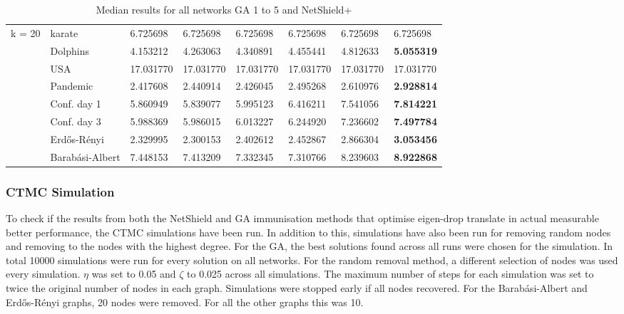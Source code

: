 \documentclass[11pt]{article}
\theoremstyle{definition}
\begin{document}
\begin{table}
\begin{center}
{\begin{tabular}{ | l | l | l | l | l | l | l | l | }
                & & & & & & & \\ \hline
                k = 20 & karate & 6.725698& 6.725698& 6.725698& 6.725698& 6.725698& 6.725698 \\ \hline
                & Dolphins & 4.153212& 4.263063& 4.340891& 4.455441& 4.812633& \textbf{5.055319} \\ \hline
                & USA & 17.031770& 17.031770& 17.031770& 17.031770& 17.031770& 17.031770 \\ \hline
                & Pandemic & 2.417608& 2.440914& 2.426045& 2.495268& 2.610976& \textbf{2.928814} \\ \hline
                & Conf. day 1 & 5.860949& 5.839077& 5.995123& 6.416211& 7.541056& \textbf{7.814221} \\ \hline
                & Conf. day 3 & 5.988369& 5.986015& 6.013227& 6.244920& 7.236602& \textbf{7.497784} \\ \hline
                & Erd\H{o}s-R\'enyi & 2.329995& 2.300153& 2.402612& 2.452867& 2.866304& \textbf{3.053456} \\ \hline
                & Barab\'asi-Albert & 7.448153& 7.413209& 7.332345& 7.310766& 8.239603& \textbf{8.922868} \\ \hline
        \end{tabular}}
        \caption{Median results for all networks GA 1 to 5 and NetShield+}       
        \label{tbl:ns_ga}
\end{center}
\end{table}

\subsubsection{CTMC Simulation}

To check if the results from both the NetShield and GA immunisation methods that optimise eigen-drop translate in actual measurable better performance, the CTMC simulations have been run. In addition to this, simulations have also been run for removing random nodes and removing to the nodes with the highest degree. For the GA, the best solutions found across all runs were chosen for the simulation. In total 10000 simulations were run for every solution on all networks. For the random removal method, a different selection of nodes was used every simulation. $\eta$ was set to 0.05 and $\zeta$ to 0.025 across all simulations. The maximum number of steps for each simulation was set to twice the original number of nodes in each graph. Simulations were stopped early if all nodes recovered.
For the Barab\'asi-Albert and Erd\H{o}s-R\'enyi graphs, 20 nodes were removed. For all the other graphs this was 10.
\end{document}
